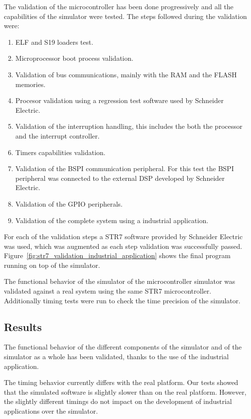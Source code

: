 The validation of the microcontroller has been done progressively and all the capabilities of the simulator were tested.
The steps followed during the validation were:
\begin{enumerate}
	\item ELF and S19 loaders test.
	\item Microprocessor boot process validation.
	\item Validation of bus communications, mainly with the RAM and the FLASH memories.
	\item Procesor validation using a regression test software used by Schneider Electric.
	\item Validation of the interruption handling, this includes the both the processor and the interrupt controller.
	\item Timers capabilities validation.
	\item Validation of the BSPI communication peripheral. For this test the BSPI peripheral was connected to the external DSP developed by Schneider Electric.
	\item Validation of the GPIO peripherals.
	\item Validation of the complete system using a industrial application.
\end{enumerate}
For each of the validation steps a STR7 software provided by Schneider Electric was used, which was augmented as each step validation was successfully passed.
Figure~\ref{fig:str7_validation_industrial_application} shows the final program running on top of the simulator.

The functional behavior of the simulator of the microcontroller simulator was validated against a real system using the same STR7 microcontroller.
Additionally timing tests were run to check the time precision of the simulator.

\subsection{Results}

The functional behavior of the different components of the simulator and of the simulator as a whole has been validated, thanks to the use of the industrial application.

The timing behavior currently differs with the real platform. 
Our tests showed that the simulated software is slightly slower than on the real platform.
However, the slightly different timings do not impact on the development of industrial applications over the simulator.

